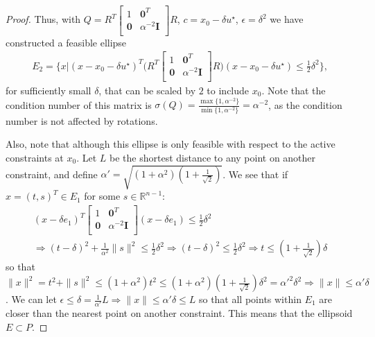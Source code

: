 \begin{proof}
Thus, with $Q = R^T\begin{bmatrix}
1 & \boldsymbol0^T \\
\boldsymbol 0 & \alpha^{-2} \boldsymbol I \\
\end{bmatrix}R$, $c = x_0 - \delta u^{\star}$, $\epsilon = \delta^2$ we have constructed a feasible ellipse
\begin{align*}
E_2 = \bigg \{x \bigg | (x - x_0 - \delta u^{\star})^T\bigg(R^T\begin{bmatrix}
1 & \boldsymbol0^T \\
\boldsymbol 0 & \alpha^{-2} \boldsymbol I \\
\end{bmatrix}R\bigg)(x - x_0 - \delta u^{\star}) \le \frac 1 2 \delta^2 \bigg\},
\end{align*}
for sufficiently small $\delta$, that can be scaled by $2$ to include $x_0$.
Note that the condition number of this matrix is $\sigma(Q) = \frac{\max\{1, \alpha^{-2}\}}{\min\{1, \alpha^{-2}\}} = \alpha^{-2}$,
as the condition number is not affected by rotations.

Also, note that although this ellipse is only feasible with respect to the active constraints at $x_0$.
Let $L$ be the shortest distance to any point on another constraint, and define $\alpha' = \sqrt{\left(1 + \alpha^2 \right) \left(1 + \frac 1 {\sqrt{2}}\right)}$.
We see that if $x = (t, s)^T \in E_1$ for some $s \in \mathbb R^{n-1}$:
\begin{align*}
(x - \delta e_1)^T\begin{bmatrix}
1 & \boldsymbol0^T \\
\boldsymbol 0 & \alpha^{-2} \boldsymbol I \\
\end{bmatrix}(x - \delta e_1) \le \frac 1 2 \delta^2 \\
\Longrightarrow (t - \delta)^2 + \frac {1} {\alpha^2} \|s\|^2 \le \frac 1 2 \delta^2
\Longrightarrow (t - \delta)^2 \le \frac 1 2 \delta^2
\Longrightarrow t \le \left(1 + \frac 1 {\sqrt{2}}\right) \delta
\end{align*}
so that $\|x\|^2 = t^2 + \|s\|^2 \le \left(1 + \alpha^2 \right) t^2 \le \left(1 + \alpha^2 \right) \left(1 + \frac 1 {\sqrt{2}}\right) \delta^2 = {\alpha'}^2 \delta^2 \Longrightarrow \|x\| \le \alpha' \delta$.
We can let $\epsilon \le \delta = \frac 1 {\alpha'} L \Longrightarrow \|x\| \le \alpha' \delta \le L$ so that all points within $E_1$ are closer than the nearest point on another constraint.
This means that the ellipsoid $E \subset P$.
\end{proof}


